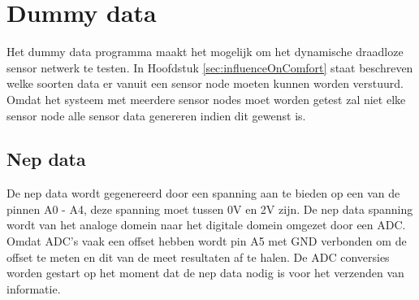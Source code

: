 \section{Dummy data} \label{sec:dummyData}
Het dummy data programma maakt het mogelijk om het dynamische draadloze sensor netwerk te testen. In Hoofdstuk \ref{sec:influenceOnComfort} staat beschreven welke soorten data er vanuit een sensor node moeten kunnen worden verstuurd. Omdat het systeem met meerdere sensor nodes moet worden getest zal niet elke sensor node alle sensor data genereren indien dit gewenst is. 

\subsection{Nep data}
De nep data wordt gegenereerd door een spanning aan te bieden op een van de pinnen A0 - A4, deze spanning moet tussen 0V en 2V zijn. De nep data spanning wordt van het analoge domein naar het digitale domein omgezet door een ADC. Omdat ADC's vaak een offset hebben wordt pin A5 met GND verbonden om de offset te meten en dit van de meet resultaten af te halen. De ADC conversies worden gestart op het moment dat de nep data nodig is voor het verzenden van informatie.

